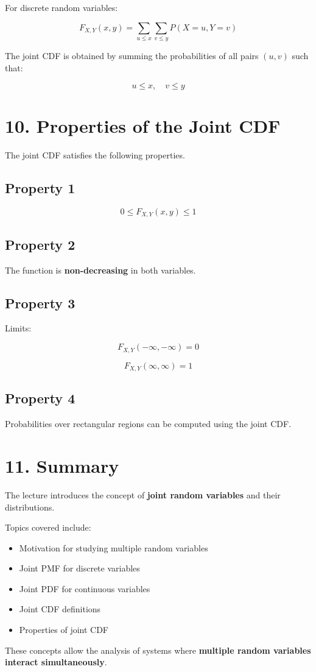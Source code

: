 \documentclass{article}
\begin{document}
For discrete random variables:

\[
F_{X,Y}(x,y)
=
\sum_{u \le x}
\sum_{v \le y}
P(X=u, Y=v)
\]

The joint CDF is obtained by summing the probabilities of all pairs $(u,v)$ such that:

\[
u \le x, \quad v \le y
\]

\section*{10. Properties of the Joint CDF}

The joint CDF satisfies the following properties.

\subsection*{Property 1}

\[
0 \le F_{X,Y}(x,y) \le 1
\]

\subsection*{Property 2}

The function is \textbf{non-decreasing} in both variables.

\subsection*{Property 3}

Limits:

\[
F_{X,Y}(-\infty,-\infty) = 0
\]

\[
F_{X,Y}(\infty,\infty) = 1
\]

\subsection*{Property 4}

Probabilities over rectangular regions can be computed using the joint CDF.

\section*{11. Summary}

The lecture introduces the concept of \textbf{joint random variables} and their distributions.

Topics covered include:

\begin{itemize}
\item Motivation for studying multiple random variables
\item Joint PMF for discrete variables
\item Joint PDF for continuous variables
\item Joint CDF definitions
\item Properties of joint CDF
\end{itemize}

These concepts allow the analysis of systems where \textbf{multiple random variables interact simultaneously}.
\end{document}
